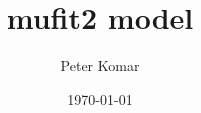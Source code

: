 \documentclass[10pt,oneside]{article}
\author{Peter Komar}
\title{mufit2 model}
\date{\today}
\begin{document}
\newcommand{\bel}{\begin{equation}}
\newcommand{\eel}{\end{equation}}
\newcommand{\be}{\begin{equation*}}
\newcommand{\ee}{\end{equation*}}

\newcommand{\bal}{\begin{eqnarray}}
\newcommand{\eal}{\end{eqnarray}}
\newcommand{\ba}{\begin{eqnarray*}}
\newcommand{\ea}{\end{eqnarray*}}

\newcommand{\ket}[1]{| #1 \rangle}
\newcommand{\Ket}[1]{\left| #1 \right\rangle}
\newcommand{\bra}[1]{\langle #1 |}
\newcommand{\Bra}[1]{\left\langle #1 \right|}

\newcommand{\no}{\noindent}

\newcommand{\ev}[1]{\langle #1 \rangle}
\newcommand{\Ev}[1]{\left\langle #1 \right\rangle}
\newcommand{\Tr}{\text{Tr}\,}
\newcommand{\T}{^\top}
\newcommand{\+}{^\dagger}
\newcommand{\s}{^\ast}
\newcommand{\PP}{\mathcal{P}}
\newcommand{\eqE}{= \!\!\!\!\!^{{}^{E}}\,}

\renewcommand{\d}[1]{\!d #1 \;}

\newcommand{\bE}{{\mathbf E}}
\newcommand{\bB}{{\mathbf B}}
\newcommand{\bF}{{\mathbf F}}
\newcommand{\bJ}{{\mathbf J}}
\newcommand{\bv}{{\mathbf v}}
\newcommand{\eps}{\varepsilon}
\newcommand{\br}{\mathbf r}
\newcommand{\bk}{\mathbf k}
\newcommand{\hatx}{\hat{\mathbf{x}}}
\newcommand{\haty}{\hat{\mathbf{y}}}
\newcommand{\hatz}{\hat{\mathbf{z}}}

\newcommand\independent{\protect\mathpalette{\protect\independenT}{\perp}}
\def\independenT#1#2{\mathrel{\rlap{$#1#2$}\mkern2mu{#1#2}}}


\renewcommand{\vec}[1]{{\bf #1}}
\newcommand{\mat}[1]{{\bf #1}}
\end{document}
